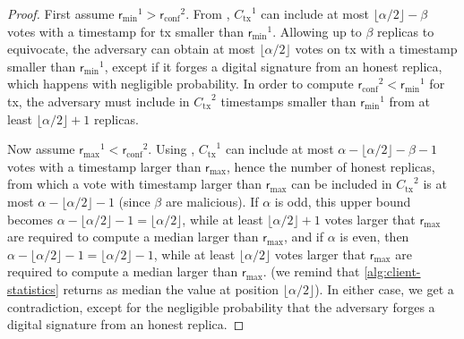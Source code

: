 \documentclass[pdflatex,sn-mathphys-num]{sn-jnl}%
\theoremstyle{thmstyleone}%
\theoremstyle{thmstyletwo}%
\theoremstyle{thmstylethree}%
\newcommand{\operand}[1]{\textsf{#1}}
\newcommand{\tx}{\operand{tx}\xspace}
\newcommand{\round}{\operand{r}\xspace}
\newcommand{\client}{\operand{c}\xspace}
\newcommand{\rconf}{\ensuremath{\round_\text{conf}}\xspace}
\newcommand{\rmin}{\ensuremath{\round_\text{min}}\xspace}
\newcommand{\rmax}{\ensuremath{\round_\text{max}}\xspace}
\newcommand{\txcert}{\ensuremath{C_\text{tx}}\xspace}
\let\oldalpha\alpha
\renewcommand{\alpha}{\ensuremath{\oldalpha}\xspace}
\let\oldbeta\beta
\renewcommand{\beta}{\ensuremath{\oldbeta}\xspace}
\begin{document}
\begin{appendices}
\begin{proof}
	First assume $\rmin^1 > \rconf^2$.
	From , $\txcert^1$ can include at most $\lfloor \alpha / 2 \rfloor - \beta$ votes with a timestamp for \tx smaller than $\rmin^1$.
	Allowing up to \beta replicas to equivocate, the adversary can obtain at most $\lfloor \alpha / 2 \rfloor$ votes on \tx with a timestamp smaller than $\rmin^1$, except if it forges a digital signature from an honest replica, which happens with negligible probability.
	In order to compute $\rconf^2 < \rmin^1$ for \tx, the adversary must include in $\txcert^2$ timestamps smaller than $\rmin^1$ from at least $\lfloor \alpha / 2 \rfloor + 1$ replicas.

	Now assume $\rmax^1 < \rconf^2$.
	Using , $\txcert^1$ can include at most $\alpha - \lfloor \alpha / 2 \rfloor - \beta - 1$ votes with a timestamp larger than \rmax,
	hence the number of honest replicas, from which a vote with timestamp larger than \rmax can be included in $\txcert^2$ is at most $\alpha - \lfloor \alpha / 2 \rfloor - 1$ (since \beta are malicious).
	If \alpha is odd, this upper bound becomes $\alpha - \lfloor \alpha / 2 \rfloor -1 = \lfloor \alpha / 2 \rfloor $, while at least
	$\lfloor \alpha / 2 \rfloor + 1$ votes larger that \rmax are required to compute a median larger than \rmax,
	and if \alpha is even, then $\alpha - \lfloor \alpha / 2 \rfloor - 1 = \lfloor \alpha / 2 \rfloor - 1$, while at least
	$\lfloor \alpha / 2 \rfloor$ votes larger that \rmax are required to compute a median larger than \rmax.
	(we remind that \cref{alg:client-statistics} returns as median the value at position $\lfloor \alpha /  2 \rfloor$).
	In either case, we get a contradiction, except for the negligible probability that the adversary forges a digital signature from an honest replica.
\end{proof}


\end{appendices}
\end{document}
